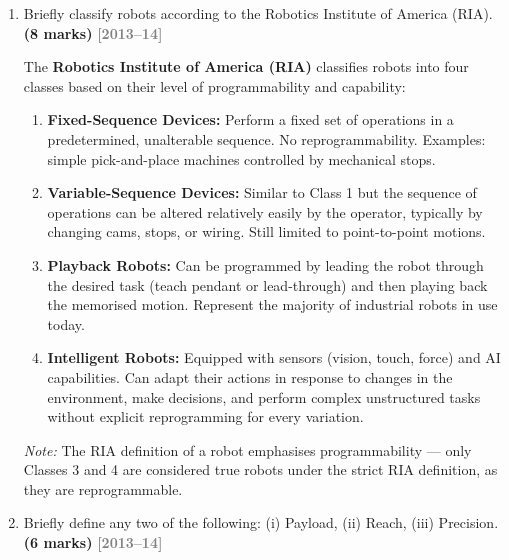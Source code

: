 \documentclass[12pt,a3paper]{article}
\newcommand{\yr}[1]{\hfill\textcolor{gray}{\small\textbf{[#1]}}}
\newcommand{\mk}[1]{\textcolor{orange!70!black}{\small\textbf{(#1 marks)}}}
\begin{document}
\begin{enumerate}
\begin{tcolorbox}[enhanced,breakable,ansbox,colback=cA!4,colframe=cA,
  boxrule=0.8pt,arc=5pt,
  title={\textbf{Answer}},fonttitle=\bfseries\color{white},colbacktitle=cA]
See \textbf{C1-Q6(a)} for detailed descriptions of each class.

\end{tcolorbox}


\item \label{qlabel:C1-Q7}
Briefly classify robots according to the Robotics Institute of America (RIA). \mk{8}
\yr{2013--14}

\begin{tcolorbox}[enhanced,breakable,ansbox,colback=cA!4,colframe=cA,
  boxrule=0.8pt,arc=5pt,
  title={\textbf{Answer}},fonttitle=\bfseries\color{white},colbacktitle=cA]

The \textbf{Robotics Institute of America (RIA)} classifies robots into
four classes based on their level of programmability and capability:

\begin{enumerate}[leftmargin=*,itemsep=4pt,label=\textbf{Class \arabic*:}]
  \item \textbf{Fixed-Sequence Devices:} Perform a fixed set of operations in
        a predetermined, unalterable sequence. No reprogrammability. Examples:
        simple pick-and-place machines controlled by mechanical stops.
  \item \textbf{Variable-Sequence Devices:} Similar to Class 1 but the
        sequence of operations can be altered relatively easily by the
        operator, typically by changing cams, stops, or wiring. Still limited
        to point-to-point motions.
  \item \textbf{Playback Robots:} Can be programmed by leading the robot
        through the desired task (teach pendant or lead-through) and then
        playing back the memorised motion. Represent the majority of
        industrial robots in use today.
  \item \textbf{Intelligent Robots:} Equipped with sensors (vision, touch,
        force) and AI capabilities. Can adapt their actions in response to
        changes in the environment, make decisions, and perform complex
        unstructured tasks without explicit reprogramming for every variation.
\end{enumerate}

\textit{Note:} The RIA definition of a robot emphasises programmability —
only Classes 3 and 4 are considered true robots under the strict RIA
definition, as they are reprogrammable.

\end{tcolorbox}

\item \label{qlabel:C1-Q8}
Briefly define any two of the following: (i) Payload, (ii) Reach, (iii) Precision. \mk{6}
\yr{2013--14}


\end{enumerate}
\end{document}

